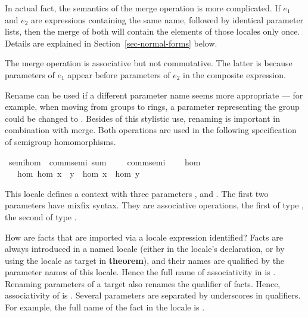 \begin{isabellebody}
\begin{isamarkuptext}
\begin{description}
  In actual fact, the semantics of the merge operation
  is more complicated.  If $e_1$ and $e_2$ are expressions containing
  the same name, followed by
  identical parameter lists, then the merge of both will contain
  the elements of those locales only once.  Details are explained in
  Section~\ref{sec-normal-forms} below.

  The merge operation is associative but not commutative.  The latter
  is because parameters of $e_1$ appear
  before parameters of $e_2$ in the composite expression.
\end{description}

  Rename can be used if a different parameter name seems more
  appropriate --- for example, when moving from groups to rings, a
  parameter  representing the group could be changed to
  .  Besides of this stylistic use, renaming is important in
  combination with merge.  Both operations are used in the following
  specification of semigroup homomorphisms.%
\end{isamarkuptext}%
\isamarkuptrue%
\isamarkupfalse%
\ semi{\isacharunderscore}hom\ {\isacharequal}\ comm{\isacharunderscore}semi\ sum\ {\isacharparenleft}\ {\isachardoublequoteopen}{\isasymoplus}{\isachardoublequoteclose}\ {}{}{\isacharparenright}\ {\isacharplus}\ comm{\isacharunderscore}semi\ {\isacharplus}\isanewline
\ \ \ hom\isanewline
\ \ \ hom{\isacharcolon}\ {\isachardoublequoteopen}hom\ {\isacharparenleft}x\ {\isasymoplus}\ y{\isacharparenright}\ {\isacharequal}\ hom\ x\ {\isasymcdot}\ hom\ y{\isachardoublequoteclose}%
\begin{isamarkuptext}%
This locale defines a context with three parameters ,
   and .  The first two parameters have
  mixfix syntax.  They are associative operations,
  the first of type , the second of
  type .  

  How are facts that are imported via a locale expression identified?
  Facts are always introduced in a named locale (either in the
  locale's declaration, or by using the locale as target in
  \textbf{theorem}), and their names are
  qualified by the parameter names of this locale.
  Hence the full name of associativity in  is
  .  Renaming parameters of a target also renames
  the qualifier of facts.  Hence, associativity of  is
  .  Several parameters are separated by
  underscores in qualifiers.  For example, the full name of the fact
   in the locale  is .


\end{isamarkuptext}
\end{isabellebody}
